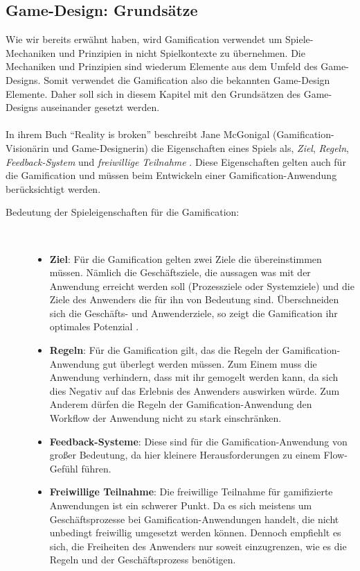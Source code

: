 \documentclass[a4paper,12pt]{scrartcl}
\begin{document}
\subsection{Game-Design: Grundsätze}
\label{Game-Design Grundsätze}
Wie wir bereits erwähnt haben, wird Gamification verwendet um Spiele-Mechaniken und Prinzipien in nicht Spielkontexte zu übernehmen. Die Mechaniken und Prinzipien sind wiederum Elemente aus dem Umfeld des Game-Designs. Somit verwendet die Gamification also die bekannten Game-Design Elemente. Daher soll sich in diesem Kapitel mit den Grundsätzen des Game-Designs auseinander gesetzt werden.
\\\\
In ihrem Buch \enquote{Reality is broken} beschreibt Jane McGonigal (Gamification-Visionärin und Game-Designerin) die Eigenschaften eines Spiels als, \textit{Ziel}, \textit{Regeln}, \textit{Feedback-System} und \textit{freiwillige Teilnahme} \cite{Mcgonigal2011}. Diese Eigenschaften gelten auch für die Gamification und müssen beim Entwickeln einer Gamification-Anwendung berücksichtigt werden.
\begin{description}
   \item[Bedeutung der Spieleigenschaften für die Gamification:]~\par
   \begin{itemize}
      \item \textbf{Ziel}: Für die Gamification gelten zwei Ziele die übereinstimmen müssen. Nämlich die Geschäftsziele, die aussagen was mit der Anwendung erreicht werden soll (Prozessziele oder Systemziele) und die Ziele des Anwenders die für ihn von Bedeutung sind. Überschneiden sich die Geschäfts- und Anwenderziele, so zeigt die Gamification ihr optimales Potenzial \cite{gamificationDefinition}. 
      \item \textbf{Regeln}: Für die Gamification gilt, das die Regeln der Gamification-Anwendung gut überlegt werden müssen. Zum Einem muss die Anwendung verhindern, dass mit ihr gemogelt werden kann, da sich dies Negativ auf das Erlebnis des Anwenders auswirken würde. Zum Anderem dürfen die Regeln der Gamification-Anwendung den Workflow der Anwendung nicht zu stark einschränken.
      \item \textbf{Feedback-Systeme}: Diese sind für die Gamification-Anwendung von großer Bedeutung, da hier kleinere Herausforderungen zu einem Flow-Gefühl führen.
      \item \textbf{Freiwillige Teilnahme}: Die freiwillige Teilnahme für gamifizierte Anwendungen ist ein schwerer Punkt. Da es sich meistens um Geschäftsprozesse bei Gamification-Anwendungen handelt, die nicht unbedingt freiwillig umgesetzt werden können. Dennoch empfiehlt es sich, die Freiheiten des Anwenders nur soweit einzugrenzen, wie es die Regeln und der Geschäftsprozess benötigen. 
   \end{itemize}
\end{description}
\end{document}
